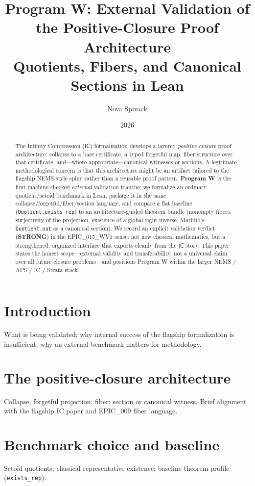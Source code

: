 \documentclass[11pt]{article}
\title{Program W: External Validation of the Positive-Closure Proof Architecture\\[0.35em]
\large Quotients, Fibers, and Canonical Sections in Lean}
\author{Nova Spivack}
\date{2026}
\newcommand{\IC}{\ensuremath{\mathsf{IC}}}
\begin{document}
\maketitle

\begin{abstract}
The Infinity Compression (\IC{}) formalization develops a layered \emph{positive-closure} proof architecture: collapse to a bare certificate, a typed forgetful map, fiber structure over that certificate, and---where appropriate---canonical witnesses or sections. A legitimate methodological concern is that this architecture might be an artifact tailored to the flagship NEMS-style spine rather than a reusable proof pattern. \textbf{Program W} is the first machine-checked \emph{external} validation tranche: we formalize an ordinary quotient/setoid benchmark in Lean, package it in the same collapse/forgetful/fiber/section language, and compare a flat baseline (\texttt{Quotient.exists_rep}) to an architecture-guided theorem bundle (nonempty fibers, surjectivity of the projection, existence of a global right inverse, Mathlib's \texttt{Quotient.out} as a canonical section). We record an explicit validation verdict (\textbf{STRONG}) in the EPIC\_015\_WV1 sense: not new classical mathematics, but a strengthened, organized interface that exports cleanly from the \IC{} story. This paper states the honest scope---external validity and transferability, not a universal claim over all future closure problems---and positions Program W within the larger NEMS / APS / IC / Strata stack.
\end{abstract}

\tableofcontents
\newpage

\section{Introduction}
What is being validated; why internal success of the flagship formalization is insufficient; why an external benchmark matters for methodology.

\section{The positive-closure architecture}
Collapse; forgetful projection; fiber; section or canonical witness. Brief alignment with the flagship IC paper and EPIC\_009 fiber language.

\section{Benchmark choice and baseline}
Setoid quotients; classical representative existence; baseline theorem profile (\texttt{exists_rep}).
\end{document}
